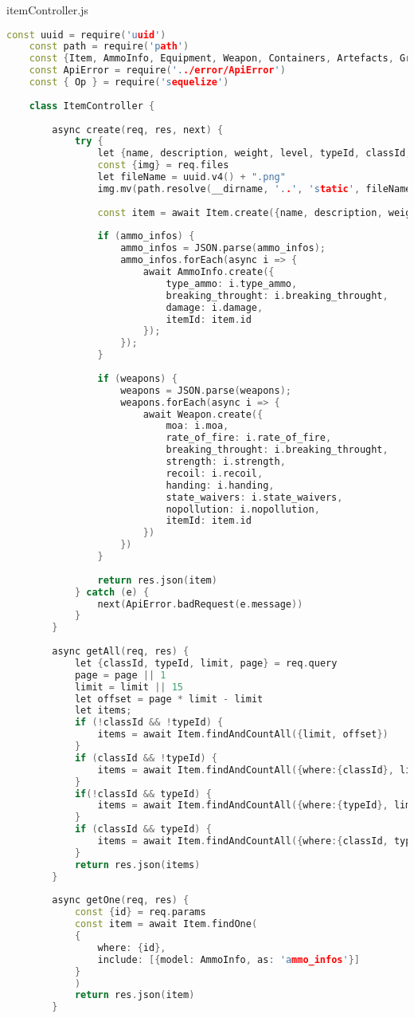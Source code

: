 itemController.js
\begin{lstlisting}[language=C++]
	const uuid = require('uuid')
	const path = require('path')
	const {Item, AmmoInfo, Equipment, Weapon, Containers, Artefacts, Grenades, StorageItem, User, Type, Class} = require('../models/models')
	const ApiError = require('../error/ApiError')
	const { Op } = require('sequelize')
	
	class ItemController {
		
		async create(req, res, next) {
			try {
				let {name, description, weight, level, typeId, classId, ammo_infos, artefacts, equipment, weapons, containers, grenade} = req.body
				const {img} = req.files
				let fileName = uuid.v4() + ".png"
				img.mv(path.resolve(__dirname, '..', 'static', fileName))
				
				const item = await Item.create({name, description, weight, level, typeId, classId, img: fileName})
				
				if (ammo_infos) {
					ammo_infos = JSON.parse(ammo_infos);
					ammo_infos.forEach(async i => {
						await AmmoInfo.create({
							type_ammo: i.type_ammo,
							breaking_throught: i.breaking_throught,
							damage: i.damage,
							itemId: item.id
						});
					});
				}
				
				if (weapons) {
					weapons = JSON.parse(weapons);
					weapons.forEach(async i => {
						await Weapon.create({
							moa: i.moa, 
							rate_of_fire: i.rate_of_fire, 
							breaking_throught: i.breaking_throught, 
							strength: i.strength, 
							recoil: i.recoil,
							handing: i.handing,
							state_waivers: i.state_waivers,
							nopollution: i.nopollution,
							itemId: item.id
						})
					})
				}
				
				return res.json(item)
			} catch (e) {
				next(ApiError.badRequest(e.message))
			}
		}
		
		async getAll(req, res) {
			let {classId, typeId, limit, page} = req.query
			page = page || 1
			limit = limit || 15
			let offset = page * limit - limit
			let items;
			if (!classId && !typeId) {
				items = await Item.findAndCountAll({limit, offset})
			}
			if (classId && !typeId) {
				items = await Item.findAndCountAll({where:{classId}, limit, offset})
			}
			if(!classId && typeId) {
				items = await Item.findAndCountAll({where:{typeId}, limit, offset})
			}
			if (classId && typeId) {
				items = await Item.findAndCountAll({where:{classId, typeId}, limit, offset})
			}
			return res.json(items)
		}
		
		async getOne(req, res) {
			const {id} = req.params
			const item = await Item.findOne(
			{
				where: {id},
				include: [{model: AmmoInfo, as: 'ammo_infos'}]
			}
			)
			return res.json(item)
		}
		

\end{lstlisting}
